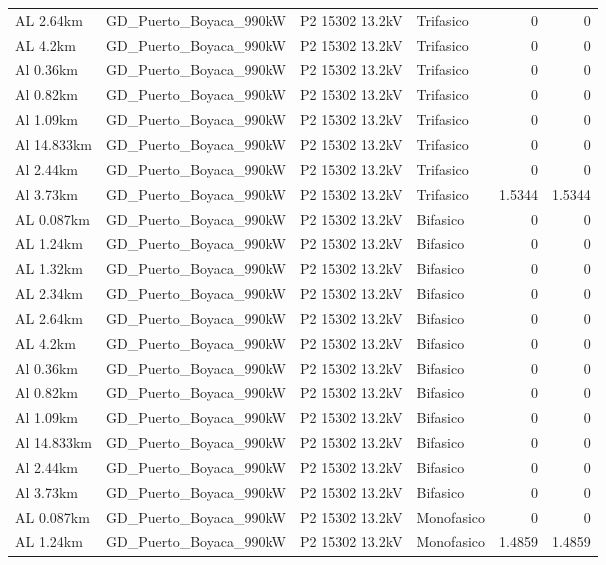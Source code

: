 \documentclass[11pt,a4paper]{article}
\begin{document}
\begin{longtable}{llllrr}
AL 2.64km & GD\_Puerto\_Boyaca\_990kW & P2 15302 13.2kV & Trifasico & 0 & 0 \\
AL 4.2km & GD\_Puerto\_Boyaca\_990kW & P2 15302 13.2kV & Trifasico & 0 & 0 \\
Al 0.36km & GD\_Puerto\_Boyaca\_990kW & P2 15302 13.2kV & Trifasico & 0 & 0 \\
Al 0.82km & GD\_Puerto\_Boyaca\_990kW & P2 15302 13.2kV & Trifasico & 0 & 0 \\
Al 1.09km & GD\_Puerto\_Boyaca\_990kW & P2 15302 13.2kV & Trifasico & 0 & 0 \\
Al 14.833km & GD\_Puerto\_Boyaca\_990kW & P2 15302 13.2kV & Trifasico & 0 & 0 \\
Al 2.44km & GD\_Puerto\_Boyaca\_990kW & P2 15302 13.2kV & Trifasico & 0 & 0 \\
Al 3.73km & GD\_Puerto\_Boyaca\_990kW & P2 15302 13.2kV & Trifasico & 1.5344 & 1.5344 \\
AL 0.087km & GD\_Puerto\_Boyaca\_990kW & P2 15302 13.2kV & Bifasico & 0 & 0 \\
AL 1.24km & GD\_Puerto\_Boyaca\_990kW & P2 15302 13.2kV & Bifasico & 0 & 0 \\
AL 1.32km & GD\_Puerto\_Boyaca\_990kW & P2 15302 13.2kV & Bifasico & 0 & 0 \\
AL 2.34km & GD\_Puerto\_Boyaca\_990kW & P2 15302 13.2kV & Bifasico & 0 & 0 \\
AL 2.64km & GD\_Puerto\_Boyaca\_990kW & P2 15302 13.2kV & Bifasico & 0 & 0 \\
AL 4.2km & GD\_Puerto\_Boyaca\_990kW & P2 15302 13.2kV & Bifasico & 0 & 0 \\
Al 0.36km & GD\_Puerto\_Boyaca\_990kW & P2 15302 13.2kV & Bifasico & 0 & 0 \\
Al 0.82km & GD\_Puerto\_Boyaca\_990kW & P2 15302 13.2kV & Bifasico & 0 & 0 \\
Al 1.09km & GD\_Puerto\_Boyaca\_990kW & P2 15302 13.2kV & Bifasico & 0 & 0 \\
Al 14.833km & GD\_Puerto\_Boyaca\_990kW & P2 15302 13.2kV & Bifasico & 0 & 0 \\
Al 2.44km & GD\_Puerto\_Boyaca\_990kW & P2 15302 13.2kV & Bifasico & 0 & 0 \\
Al 3.73km & GD\_Puerto\_Boyaca\_990kW & P2 15302 13.2kV & Bifasico & 0 & 0 \\
AL 0.087km & GD\_Puerto\_Boyaca\_990kW & P2 15302 13.2kV & Monofasico & 0 & 0 \\
AL 1.24km & GD\_Puerto\_Boyaca\_990kW & P2 15302 13.2kV & Monofasico & 1.4859 & 1.4859 \\

\end{longtable}
\end{document}

